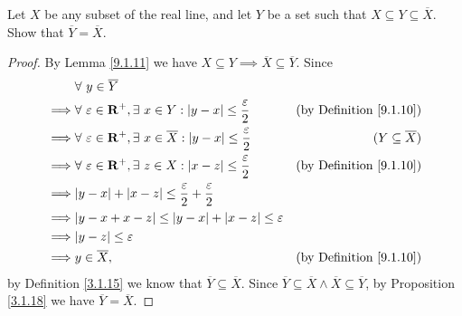 \exercisesection

\begin{exercise}\label{ex 9.1.1}
    Let \(X\) be any subset of the real line, and let \(Y\) be a set such that \(X \subseteq Y \subseteq \overline{X}\).
    Show that \(\overline{Y} = \overline{X}\).
\end{exercise}

\begin{proof}
    By Lemma \ref{9.1.11} we have \(X \subseteq Y \implies \overline{X} \subseteq \overline{Y}\).
    Since
    \begin{align*}
                 & \forall\ y \in \overline{Y}                                                                                                                        \\
        \implies & \forall\ \varepsilon \in \mathbf{R}^+, \exists\ x \in Y : \abs*{y - x} \leq \frac{\varepsilon}{2}            & \text{(by Definition \ref{9.1.10})} \\
        \implies & \forall\ \varepsilon \in \mathbf{R}^+, \exists\ x \in \overline{X} : \abs*{y - x} \leq \frac{\varepsilon}{2} & (Y \subseteq \overline{X})          \\
        \implies & \forall\ \varepsilon \in \mathbf{R}^+, \exists\ z \in X : \abs*{x - z} \leq \frac{\varepsilon}{2}            & \text{(by Definition \ref{9.1.10})} \\
        \implies & \abs*{y - x} + \abs*{x - z} \leq \frac{\varepsilon}{2} + \frac{\varepsilon}{2}                                                                     \\
        \implies & \abs*{y - x + x - z} \leq \abs*{y - x} + \abs*{x - z} \leq \varepsilon                                                                             \\
        \implies & \abs*{y - z} \leq \varepsilon                                                                                                                      \\
        \implies & y \in \overline{X},                                                                                          & \text{(by Definition \ref{9.1.10})}
    \end{align*}
    by Definition \ref{3.1.15} we know that \(\overline{Y} \subseteq \overline{X}\).
    Since \(\overline{Y} \subseteq \overline{X} \land \overline{X} \subseteq \overline{Y}\), by Proposition \ref{3.1.18} we have \(\overline{Y} = \overline{X}\).
\end{proof}

